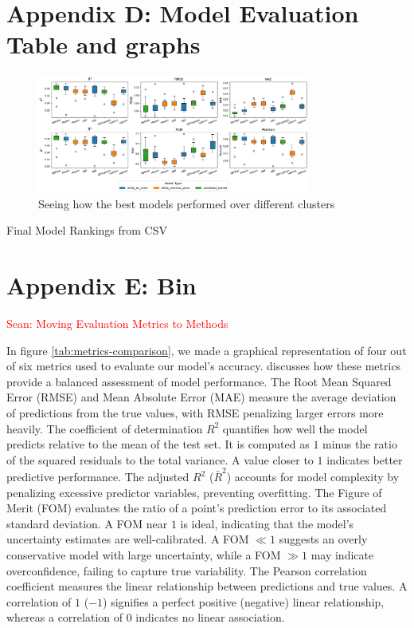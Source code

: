 \documentclass[12pt]{article}
\newcommand{\Sean}[1]{{\textcolor{red}{{Sean: #1}} }}
\begin{document}
\section{Appendix D: Model Evaluation Table and graphs}
\label{appendix:D}

\begin{figure}[H]
    \centering
    \includegraphics[width=0.8\textwidth]{LatexPlots/CV_plots/boxplots.png}
    \caption{Seeing how the best models performed over different clusters}
    \label{fig:boxplots}
\end{figure}

\begin{table}[H]
    \centering
    \caption{Final Model Rankings from CSV}
    {\fontsize{7}{9.5}\selectfont
    }
    \label{tab:rankingtable}
\end{table}
    

\section{Appendix E: Bin}
\label{appendix:bin}
\Sean{Moving Evaluation Metrics to Methods}

In figure \ref{tab:metrics-comparison}, we made a graphical representation of four out of six metrics used to evaluate our model’s accuracy. \cite{bible} discusses how these metrics provide a balanced assessment of model performance.
The Root Mean Squared Error (RMSE) and Mean Absolute Error (MAE) measure the average deviation of predictions from the true values, with RMSE penalizing larger errors more heavily.
The coefficient of determination \( R^2 \) quantifies how well the model predicts relative to the mean of the test set. It is computed as \( 1 \) minus the ratio of the squared residuals to the total variance. A value closer to \( 1 \) indicates better predictive performance.
The adjusted \( R^2 \) (\(\bar{R}^2\)) accounts for model complexity by penalizing excessive predictor variables, preventing overfitting.
The Figure of Merit (FOM) evaluates the ratio of a point’s prediction error to its associated standard deviation. A FOM near \( 1 \) is ideal, indicating that the model’s uncertainty estimates are well-calibrated. A FOM \( \ll 1 \) suggests an overly conservative model with large uncertainty, while a FOM \( \gg 1 \) may indicate overconfidence, failing to capture true variability.
The Pearson correlation coefficient measures the linear relationship between predictions and true values. A correlation of \( 1 \) (\(-1\)) signifies a perfect positive (negative) linear relationship, whereas a correlation of \( 0 \) indicates no linear association.
\end{document}

